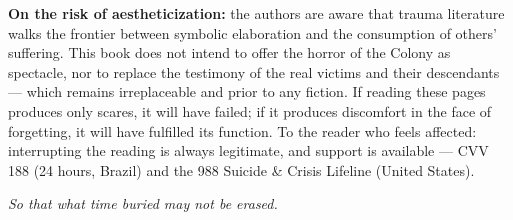 \vspace{0.8em}

\noindent \textbf{On the risk of aestheticization:} the authors are aware
that trauma literature walks the frontier between symbolic elaboration and
the consumption of others' suffering. This book does not intend to offer
the horror of the Colony as spectacle, nor to replace the testimony of the
real victims and their descendants --- which remains irreplaceable and
prior to any fiction. If reading these pages produces only scares, it will
have failed; if it produces discomfort in the face of forgetting, it will
have fulfilled its function. To the reader who feels affected: interrupting
the reading is always legitimate, and support is available --- CVV 188
(24 hours, Brazil) and the 988 Suicide \& Crisis Lifeline (United States).

\vspace{1.2em}

\noindent\hfill\textit{So that what time buried may not be erased.}\hspace{2em}
